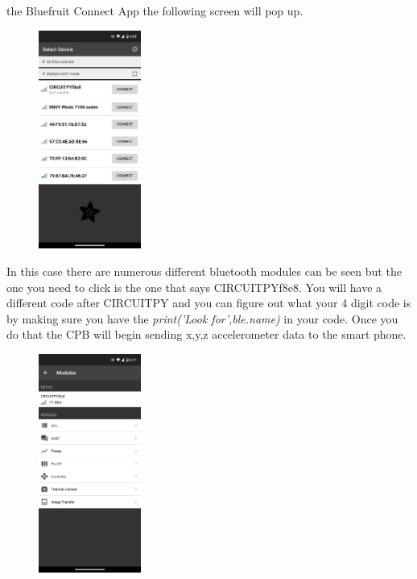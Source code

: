 the Bluefruit Connect App the following screen will pop up. 
\begin{figure}[H]
  \begin{center}
    \includegraphics[width=0.3\textwidth]{Figures/phoneapp1.png}
  \end{center}
\end{figure}
In this case there are numerous different bluetooth modules can be
seen but the one you need to click is the one that says
CIRCUITPYf8e8. You will have a different code after CIRCUITPY and you
can figure out what your 4 digit code is by making sure you have the
{\it print('Look for',ble.name)} in your code. Once you do that the
CPB will begin sending x,y,z accelerometer data to the smart phone.  
\begin{figure}[H]
  \begin{center}
    \includegraphics[width=0.3\textwidth]{Figures/phoneapp2.png}
  \end{center}
\end{figure}
